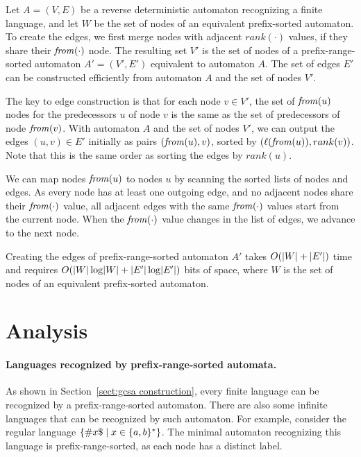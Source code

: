 Let $A = (V, E)$ be a reverse deterministic automaton recognizing a finite language, and let $W$ be the set of nodes of an equivalent prefix-sorted automaton. To create the edges, we first merge nodes with adjacent $rank(\cdot)$ values, if they share their $\mathit{from}(\cdot)$ node. The resulting set $V'$ is the set of nodes of a prefix-range-sorted automaton $A' = (V', E')$ equivalent to automaton $A$. The set of edges $E'$ can be constructed efficiently from automaton $A$ and the set of nodes $V'$.

The key to edge construction is that for each node $v \in V'$, the set of $\mathit{from}(u)$ nodes for the predecessors $u$ of node $v$ is the same as the set of predecessors of node $\mathit{from}(v)$. With automaton $A$ and the set of nodes $V'$, we can output the edges $(u,v) \in E'$ initially as pairs $(\mathit{from}(u), v)$, sorted by $(\ell(\mathit{from}(u)), rank(v))$. Note that this is the same order as sorting the edges by $rank(u)$.

We can map nodes $\mathit{from}(u)$ to nodes $u$ by scanning the sorted lists of nodes and edges. As every node has at least one outgoing edge, and no adjacent nodes share their $\mathit{from}(\cdot)$ value, all adjacent edges with the same $\mathit{from}(\cdot)$ values start from the current node. When the $\mathit{from}(\cdot)$ value changes in the list of edges, we advance to the next node.

\begin{lemma}\label{lemma:edge construction}
Creating the edges of prefix-range-sorted automaton $A'$ takes $O(\lvert W \rvert + \lvert E' \rvert)$ time and requires $O(\lvert W \rvert \log \lvert W \rvert + \lvert E' \rvert \log \lvert E' \rvert)$ bits of space, where $W$ is the set of nodes of an equivalent prefix-sorted automaton.
\end{lemma}


\section{Analysis}\label{sect:gcsa analysis}

\paragraph{Languages recognized by prefix-range-sorted automata.}

As shown in Section~\ref{sect:gcsa construction}, every finite language can be recognized by a prefix-range-sorted automaton. There are also some infinite languages that can be recognized by such automaton. For example, consider the regular language $\{  \# x \$ \mid x \in \{ a, b \}^{\ast} \}$. The minimal automaton recognizing this language is prefix-range-sorted, as each node has a distinct label.

